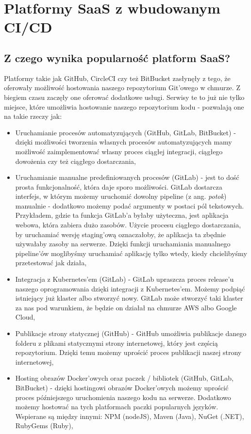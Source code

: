 \section{Platformy SaaS z wbudowanym CI/CD}
\subsection{Z czego wynika popularność platform SaaS?}
Platformy takie jak GitHub, CircleCI czy też BitBucket zasłynęły z tego, że oferowały możliwość hostowania naszego repozytorium Git'owego w chmurze. Z biegiem czasu zaczęły one oferować dodatkowe usługi. Serwisy te to już nie tylko miejsce, które umożliwia hostowanie naszego repozytorium kodu - pozwalają one na takie rzeczy jak:
\begin{itemize}
    \item Uruchamianie procesów automatyzujących (GitHub, GitLab, BitBucket) - dzięki możliwości tworzenia własnych procesów automatyzujących mamy możliwość zaimplementować własny proces ciągłej integracji, ciągłego dowożenia czy też ciągłego dostarczania,
    \item Uruchamianie manualne predefiniowanych procesów (GitLab) - jest to dość prosta funkcjonalność, która daje sporo możliwości. GitLab dostarcza interfejs, w którym możemy uruchomić dowolny pipeline (z ang. \textit{potok}) manualnie - dodatkowo możemy podać argumenty w postaci pól tekstowych. Przykładem, gdzie ta funkcja GitLab'a byłaby użyteczna, jest aplikacja webowa, która zabiera dużo zasobów. Użycie procesu ciągłego dostarczania, by uruchamiać wersję staging'ową oznaczałoby, że aplikacja ta zbędnie używałaby zasoby na serwerze. Dzięki funkcji uruchamiania manualnego pipeline'ów moglibyśmy uruchamiać aplikację tylko wtedy, kiedy chcielibyśmy przetestować jak działa,
    \item Integracja z Kubernetes'em (GitLab) - GitLab upraszcza proces release'u naszego oprogramowania dzięki integracji z Kubernetes'em. Możemy podpiąć istniejący już klaster albo stworzyć nowy. GitLab może stworzyć taki klaster za nas pod warunkiem, że będzie on działał na chmurze AWS albo Google Cloud,
    \item Publikacje strony statycznej (GitHub) - GitHub umożliwia publikacje danego folderu z plikami statycznymi strony internetowej, który jest częścią repozytorium. Dzięki temu możemy uprościć proces publikacji naszej strony internetowej,
    \item Hosting obrazów Docker'owych oraz paczek / bibliotek (GitHub, GitLab, BitBucket) - dzięki hostingowi obrazów Docker'owych możemy uprościć proces późniejszego uruchomienia naszego kodu na serwerze. Dodatkowo możemy hostować na tych platformach paczki popularnych języków. Wspierane są między innymi: NPM (nodeJS), Maven (Java), NuGet (.NET), RubyGems (Ruby),

\end{itemize}
